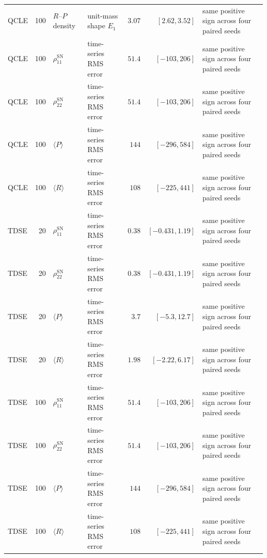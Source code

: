 \begin{landscape}
\begin{longtable}{l r l l r r L{0.23\textwidth}}
QCLE & 100 & $R$--$P$ density & unit-mass shape $E_1$ & $3.07$ & $[2.62,3.52]$ & same positive sign across four paired seeds \\
QCLE & 100 & $\rho_{11}^{\mathrm{SN}}$ & time-series RMS error & $51.4$ & $[-103,206]$ & same positive sign across four paired seeds \\
QCLE & 100 & $\rho_{22}^{\mathrm{SN}}$ & time-series RMS error & $51.4$ & $[-103,206]$ & same positive sign across four paired seeds \\
QCLE & 100 & $\langle P\rangle$ & time-series RMS error & $144$ & $[-296,584]$ & same positive sign across four paired seeds \\
QCLE & 100 & $\langle R\rangle$ & time-series RMS error & $108$ & $[-225,441]$ & same positive sign across four paired seeds \\
TDSE & 20 & $\rho_{11}^{\mathrm{SN}}$ & time-series RMS error & $0.38$ & $[-0.431,1.19]$ & same positive sign across four paired seeds \\
TDSE & 20 & $\rho_{22}^{\mathrm{SN}}$ & time-series RMS error & $0.38$ & $[-0.431,1.19]$ & same positive sign across four paired seeds \\
TDSE & 20 & $\langle P\rangle$ & time-series RMS error & $3.7$ & $[-5.3,12.7]$ & same positive sign across four paired seeds \\
TDSE & 20 & $\langle R\rangle$ & time-series RMS error & $1.98$ & $[-2.22,6.17]$ & same positive sign across four paired seeds \\
TDSE & 100 & $\rho_{11}^{\mathrm{SN}}$ & time-series RMS error & $51.4$ & $[-103,206]$ & same positive sign across four paired seeds \\
TDSE & 100 & $\rho_{22}^{\mathrm{SN}}$ & time-series RMS error & $51.4$ & $[-103,206]$ & same positive sign across four paired seeds \\
TDSE & 100 & $\langle P\rangle$ & time-series RMS error & $144$ & $[-296,584]$ & same positive sign across four paired seeds \\
TDSE & 100 & $\langle R\rangle$ & time-series RMS error & $108$ & $[-225,441]$ & same positive sign across four paired seeds \\
\end{longtable}
\endgroup
\end{landscape}

